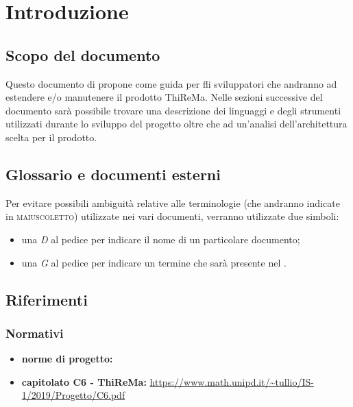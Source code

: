 \section{Introduzione}
	\subsection{Scopo del documento}
		Questo documento di propone come guida per fli sviluppatori che andranno ad estendere e/o manutenere il prodotto ThiReMa. Nelle sezioni successive del documento sarà possibile trovare una descrizione dei linguaggi e degli strumenti utilizzati durante lo sviluppo del progetto oltre che ad un'analisi dell'architettura scelta per il prodotto.
			\subsection{Glossario e documenti esterni}
		Per evitare possibili ambiguità relative alle terminologie (che andranno indicate in \textsc{maiuscoletto}) utilizzate nei vari documenti, verranno utilizzate due simboli:
		\begin{itemize}
			\item una \textit{D} al pedice per indicare il nome di un particolare documento;
			\item una \textit{G} al pedice per indicare un termine che sarà presente nel .
		\end{itemize}
		\subsection{Riferimenti}
		\subsubsection{Normativi}
			\begin{itemize}
				\item \textbf{norme di progetto: } 
				\item \textbf{capitolato C6 - ThiReMa: }\url{https://www.math.unipd.it/~tullio/IS-1/2019/Progetto/C6.pdf}
			\end{itemize}
